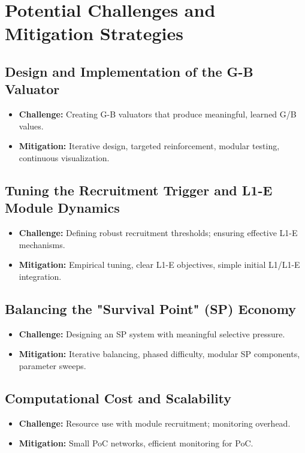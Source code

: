 \documentclass{article}
\begin{document}
\section{Potential Challenges and Mitigation Strategies}

\subsection{Design and Implementation of the G-B Valuator}
\begin{itemize}
    \item \textbf{Challenge:} Creating G-B valuators that produce meaningful, learned G/B values.
    \item \textbf{Mitigation:} Iterative design, targeted reinforcement, modular testing, continuous visualization.
\end{itemize}

\subsection{Tuning the Recruitment Trigger and L1-E Module Dynamics}
\begin{itemize}
    \item \textbf{Challenge:} Defining robust recruitment thresholds; ensuring effective L1-E mechanisms.
    \item \textbf{Mitigation:} Empirical tuning, clear L1-E objectives, simple initial L1/L1-E integration.
\end{itemize}

\subsection{Balancing the "Survival Point" (SP) Economy}
\begin{itemize}
    \item \textbf{Challenge:} Designing an SP system with meaningful selective pressure.
    \item \textbf{Mitigation:} Iterative balancing, phased difficulty, modular SP components, parameter sweeps.
\end{itemize}

\subsection{Computational Cost and Scalability}
\begin{itemize}
    \item \textbf{Challenge:} Resource use with module recruitment; monitoring overhead.
    \item \textbf{Mitigation:} Small PoC networks, efficient monitoring for PoC.
\end{itemize}
\end{document}
